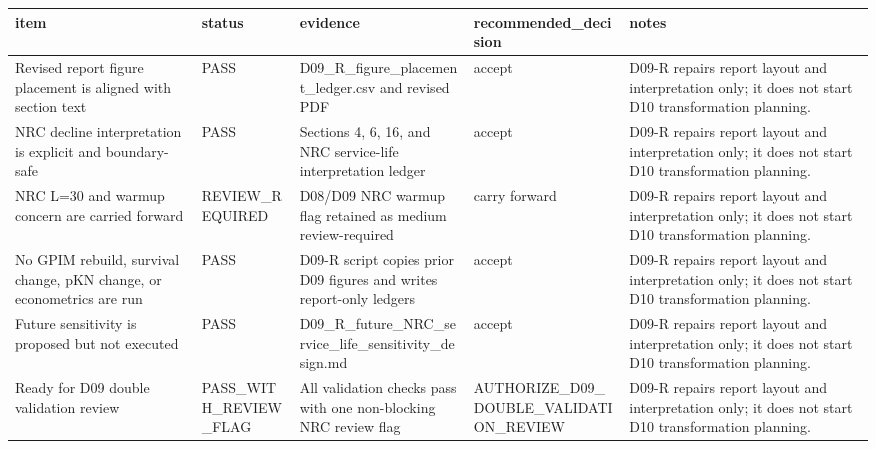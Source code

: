 
\begin{tabular}{lllll}
\toprule
item & status & evidence & recommended\_decision & notes\\
\midrule
Revised report figure placement is aligned with section text & PASS & D09\_R\_figure\_placement\_ledger.csv and revised PDF & accept & D09-R repairs report layout and interpretation only; it does not start D10 transformation planning.\\
NRC decline interpretation is explicit and boundary-safe & PASS & Sections 4, 6, 16, and NRC service-life interpretation ledger & accept & D09-R repairs report layout and interpretation only; it does not start D10 transformation planning.\\
NRC L=30 and warmup concern are carried forward & REVIEW\_REQUIRED & D08/D09 NRC warmup flag retained as medium review-required & carry forward & D09-R repairs report layout and interpretation only; it does not start D10 transformation planning.\\
No GPIM rebuild, survival change, pKN change, or econometrics are run & PASS & D09-R script copies prior D09 figures and writes report-only ledgers & accept & D09-R repairs report layout and interpretation only; it does not start D10 transformation planning.\\
Future sensitivity is proposed but not executed & PASS & D09\_R\_future\_NRC\_service\_life\_sensitivity\_design.md & accept & D09-R repairs report layout and interpretation only; it does not start D10 transformation planning.\\
\addlinespace
Ready for D09 double validation review & PASS\_WITH\_REVIEW\_FLAG & All validation checks pass with one non-blocking NRC review flag & AUTHORIZE\_D09\_DOUBLE\_VALIDATION\_REVIEW & D09-R repairs report layout and interpretation only; it does not start D10 transformation planning.\\
\bottomrule
\end{tabular}
